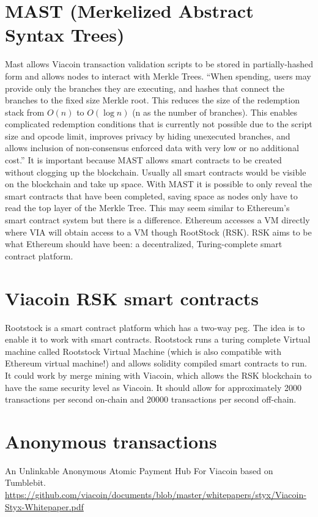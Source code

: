 \documentclass{article}
\begin{document}
\section{MAST (Merkelized Abstract Syntax Trees)} \label{MAST (Merkelized Abstract Syntax Trees)}
\cite{MAST}Mast allows Viacoin transaction validation scripts to be stored in partially-hashed
form and allows nodes to interact with Merkle Trees.
“When spending, users may provide only the branches they are executing, and
hashes that connect the branches to the fixed size Merkle root. This reduces the
size of the redemption stack from $O(n)$ to $O(\log{}n)$ (n as the number of branches).
This enables complicated redemption conditions that is currently not possible
due to the script size and opcode limit, improves privacy by hiding unexecuted
branches, and allows inclusion of non-consensus enforced data with very low or
no additional cost.” \newline \newline \noindent
It is important because MAST allows smart contracts to be created without
clogging up the blockchain. Usually all smart contracts would be visible on the
blockchain and take up space. With MAST it is possible to only reveal the smart contracts that have
been completed, saving space as nodes only have to read the top layer of the
Merkle Tree.
\noindent
This may seem similar to Ethereum's smart contract system but there is a difference. Ethereum accesses a VM directly
where VIA will obtain access to a VM though RootStock (RSK). 
RSK aims to be what Ethereum should have been: a decentralized, Turing-complete smart
contract platform.

\section{Viacoin RSK smart contracts} \label{Viacoin RSK smart contracts}
\cite{rootstock}Rootstock is a smart contract platform which has a two-way peg. The idea is to
enable it to work with smart contracts. Rootstock runs a turing complete Virtual
machine called Rootstock Virtual Machine (which is also compatible with Ethereum
virtual machine!) and allows solidity compiled smart contracts to run.
It could work by merge mining with Viacoin, which allows the RSK blockchain to
have the same security level as Viacoin. It should allow for approximately 2000
transactions per second on-chain and 20000 transactions per second off-chain.

\section{Anonymous transactions} \label{Anonymous transactions}
\cite{styx}An Unlinkable Anonymous Atomic Payment Hub For Viacoin based on Tumblebit.\newline
\url{https://github.com/viacoin/documents/blob/master/whitepapers/styx/Viacoin-Styx-Whitepaper.pdf}
\newpage
\printbibliography
\end{document}
